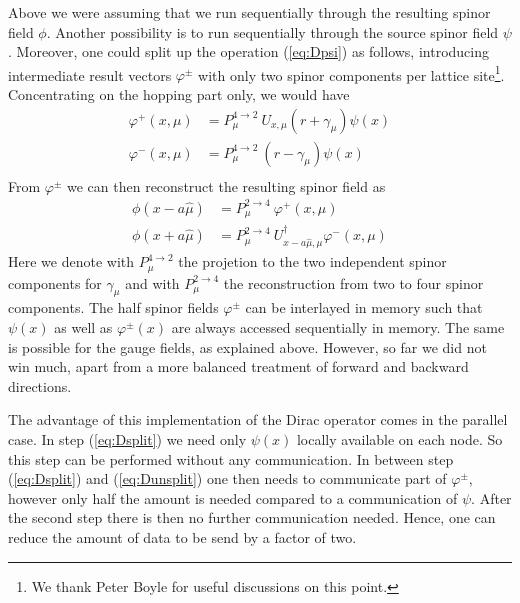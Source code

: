 Above we were assuming that we run sequentially through the resulting
spinor field $\phi$. Another possibility is to run sequentially
through the source spinor field $\psi$. Moreover, one could split up
the operation (\ref{eq:Dpsi}) as follows, introducing intermediate
result vectors $\varphi^\pm$ with only two spinor components per lattice
site\footnote{We thank Peter Boyle for useful discussions on this
  point.}. Concentrating on the hopping part only, we would have 
\begin{equation}
  \label{eq:Dsplit}
  \begin{split}
    \varphi^+(x, \mu) &= P_\mu^{4\to2}\ U_{x,\mu}(r+\gamma_\mu) \psi(x) \\
    \varphi^-(x, \mu) &= P_\mu^{4\to2}\ (r-\gamma_\mu) \psi(x) \\
  \end{split}
\end{equation}
From $\varphi^\pm$ we can then reconstruct the resulting spinor field 
as
\begin{equation}
  \label{eq:Dunsplit}
  \begin{split}
    \phi(x-a\hat\mu) &= P_\mu^{2\to4}\ \varphi^+(x, \mu) \\
    \phi(x+a\hat\mu) &= P_\mu^{2\to4}\
    U^\dagger_{x-a\hat\mu,\mu}\varphi^-(x, \mu)
  \end{split}
\end{equation}
Here we denote with $P_\mu^{4\to2}$ the projetion to the two
independent spinor components for $\gamma_\mu$ and with
$P_\mu^{2\to4}$ the reconstruction from two to four spinor
components. The half spinor fields $\varphi^\pm$ can be interlayed in
memory such that $\psi(x)$ as well as $\varphi^\pm(x)$ are always
accessed sequentially in memory. The same is possible for the gauge
fields, as explained above. However, so far we did not win much,
apart from a more balanced treatment of forward and backward
directions. 

The advantage of this implementation of the Dirac operator comes
in the parallel case. In step (\ref{eq:Dsplit}) we need only $\psi(x)$
locally available on each node. So this step can be performed without
any communication. In between step (\ref{eq:Dsplit}) and
(\ref{eq:Dunsplit}) one then needs to communicate part of
$\varphi^\pm$, however only half the amount is needed compared to a
communication of $\psi$. After the second step there is then no
further communication needed. Hence, one can reduce the amount of data
to be send by a factor of two. 

